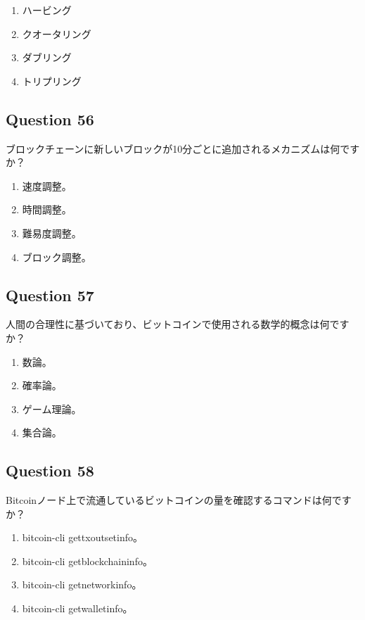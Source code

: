 \documentclass[12pt,a4paper]{article}
\begin{document}
\begin{enumerate}[label=\Alph*., leftmargin=*]
\item ハービング
\item クオータリング
\item ダブリング
\item トリプリング
\end{enumerate}

\bigskip


\subsection*{Question 56}
ブロックチェーンに新しいブロックが10分ごとに追加されるメカニズムは何ですか？

\begin{enumerate}[label=\Alph*., leftmargin=*]
\item 速度調整。
\item 時間調整。
\item 難易度調整。
\item ブロック調整。
\end{enumerate}

\bigskip


\subsection*{Question 57}
人間の合理性に基づいており、ビットコインで使用される数学的概念は何ですか？

\begin{enumerate}[label=\Alph*., leftmargin=*]
\item 数論。
\item 確率論。
\item ゲーム理論。
\item 集合論。
\end{enumerate}

\bigskip


\subsection*{Question 58}
Bitcoinノード上で流通しているビットコインの量を確認するコマンドは何ですか？

\begin{enumerate}[label=\Alph*., leftmargin=*]
\item bitcoin-cli gettxoutsetinfo。
\item bitcoin-cli getblockchaininfo。
\item bitcoin-cli getnetworkinfo。
\item bitcoin-cli getwalletinfo。
\end{enumerate}
\end{document}
